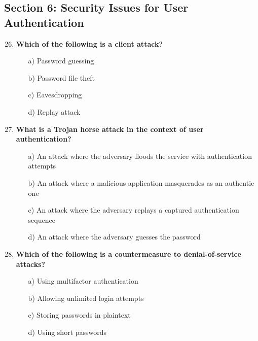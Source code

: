 \documentclass{article}
\begin{document}
\subsection*{Section 6: Security Issues for User Authentication}
\begin{enumerate}
    \setcounter{enumi}{25}
    \item \textbf{Which of the following is a client attack?}
    \begin{itemize}
        \item[a)] Password guessing  
        \item[b)] Password file theft  
        \item[c)] Eavesdropping  
        \item[d)] Replay attack  
    \end{itemize}

    \item \textbf{What is a Trojan horse attack in the context of user authentication?}
    \begin{itemize}
        \item[a)] An attack where the adversary floods the service with authentication attempts  
        \item[b)] An attack where a malicious application masquerades as an authentic one  
        \item[c)] An attack where the adversary replays a captured authentication sequence  
        \item[d)] An attack where the adversary guesses the password  
    \end{itemize}

\newpage

    \item \textbf{Which of the following is a countermeasure to denial-of-service attacks?}
    \begin{itemize}
        \item[a)] Using multifactor authentication  
        \item[b)] Allowing unlimited login attempts  
        \item[c)] Storing passwords in plaintext  
        \item[d)] Using short passwords  
    \end{itemize}
\end{enumerate}
\end{document}
